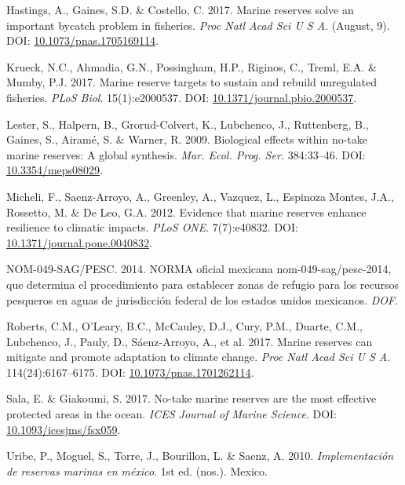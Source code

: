 \documentclass[12pt,]{article}
\begin{document}
\hypertarget{ref-hastings_2017-sm}{}
Hastings, A., Gaines, S.D. \& Costello, C. 2017. Marine reserves solve
an important bycatch problem in fisheries. \emph{Proc Natl Acad Sci U S
A}. (August, 9). DOI:
\href{https://doi.org/10.1073/pnas.1705169114}{10.1073/pnas.1705169114}.

\hypertarget{ref-krueck_2017-J1}{}
Krueck, N.C., Ahmadia, G.N., Possingham, H.P., Riginos, C., Treml, E.A.
\& Mumby, P.J. 2017. Marine reserve targets to sustain and rebuild
unregulated fisheries. \emph{PLoS Biol}. 15(1):e2000537. DOI:
\href{https://doi.org/10.1371/journal.pbio.2000537}{10.1371/journal.pbio.2000537}.

\hypertarget{ref-lester_2009-Ks}{}
Lester, S., Halpern, B., Grorud-Colvert, K., Lubchenco, J., Ruttenberg,
B., Gaines, S., Airamé, S. \& Warner, R. 2009. Biological effects within
no-take marine reserves: A global synthesis. \emph{Mar. Ecol. Prog.
Ser.} 384:33--46. DOI:
\href{https://doi.org/10.3354/meps08029}{10.3354/meps08029}.

\hypertarget{ref-micheli_2012-EU}{}
Micheli, F., Saenz-Arroyo, A., Greenley, A., Vazquez, L., Espinoza
Montes, J.A., Rossetto, M. \& De Leo, G.A. 2012. Evidence that marine
reserves enhance resilience to climatic impacts. \emph{PLoS ONE}.
7(7):e40832. DOI:
\href{https://doi.org/10.1371/journal.pone.0040832}{10.1371/journal.pone.0040832}.

\hypertarget{ref-nom049sagpesc_2014-V6}{}
NOM-049-SAG/PESC. 2014. NORMA oficial mexicana nom-049-sag/pesc-2014,
que determina el procedimiento para establecer zonas de refugio para los
recursos pesqueros en aguas de jurisdicción federal de los estados
unidos mexicanos. \emph{DOF}.

\hypertarget{ref-roberts_2017-J9}{}
Roberts, C.M., O'Leary, B.C., McCauley, D.J., Cury, P.M., Duarte, C.M.,
Lubchenco, J., Pauly, D., Sáenz-Arroyo, A., et al. 2017. Marine reserves
can mitigate and promote adaptation to climate change. \emph{Proc Natl
Acad Sci U S A}. 114(24):6167--6175. DOI:
\href{https://doi.org/10.1073/pnas.1701262114}{10.1073/pnas.1701262114}.

\hypertarget{ref-sala_2017-69}{}
Sala, E. \& Giakoumi, S. 2017. No-take marine reserves are the most
effective protected areas in the ocean. \emph{ICES Journal of Marine
Science}. DOI:
\href{https://doi.org/10.1093/icesjms/fsx059}{10.1093/icesjms/fsx059}.

\hypertarget{ref-uribe_2010-u2}{}
Uribe, P., Moguel, S., Torre, J., Bourillon, L. \& Saenz, A. 2010.
\emph{Implementación de reservas marinas en méxico}. 1st ed. (nos.).
Mexico.
\end{document}
